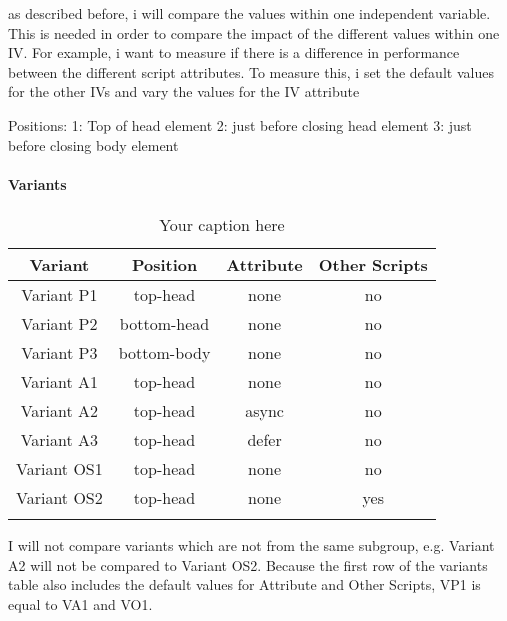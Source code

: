as described before, i will compare the values within one independent variable. 
This is needed in order to compare the impact of the different values within one IV.
For example, i want to measure if there is a difference in performance between the different script attributes. To measure this, i set the default values for the other IVs and vary the values for the IV attribute

Positions:
1: Top of head element
2: just before closing head element
3: just before closing body element




\paragraph{Variants}

\begin{center}
	\begin{longtable}{ |c|c|c|c|  }
	\hline
	Variant & Position & Attribute & Other Scripts \\
	\hline
	Variant P1 & top-head & \cellcolor{lightgrey} none & \cellcolor{lightgrey} no \\
	   Variant P2 & bottom-head & \cellcolor{lightgrey} none & \cellcolor{lightgrey} no \\
	   Variant P3 & bottom-body & \cellcolor{lightgrey} none & \cellcolor{lightgrey} no \\
	  \hline
	   Variant A1 & \cellcolor{lightgrey} top-head & none & \cellcolor{lightgrey} no \\
	   Variant A2 & \cellcolor{lightgrey} top-head & async & \cellcolor{lightgrey} no \\
	   Variant A3 & \cellcolor{lightgrey} top-head & defer & \cellcolor{lightgrey} no \\
	  \hline
	  Variant OS1 & \cellcolor{lightgrey} top-head & \cellcolor{lightgrey} none & no \\
	  Variant OS2 & \cellcolor{lightgrey} top-head & \cellcolor{lightgrey} none & yes \\
	  \hline
	\caption{Your caption here} %
	\label{tab:myfirstlongtable}
	\end{longtable}
\end{center}


I will not compare variants which are not from the same subgroup, e.g. Variant A2 will not be compared to Variant OS2.
Because the first row of the variants table also includes the default values for Attribute and Other Scripts, VP1 is equal to VA1 and VO1.

